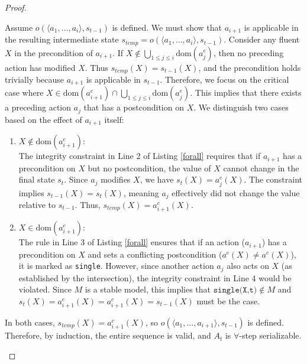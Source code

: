 \documentclass[
     11pt,                    %
     a4paper,             %
     BCOR=10mm,     %
     DIV=14,                 %
     listof=totoc,                    %
     bibliography=totoc,       %
     index=totoc,              %
     parskip            %
     twoside,
     headsepline
     ]{scrreprt}
\theoremstyle{definition}
\theoremstyle{definition}
\theoremstyle{remark}
\theoremstyle{bfnote}
\newcommand{\dom}{\mathrm{dom}}
\begin{document}
\begin{proof}
\begin{itemize}
      Assume $o(\langle a_1, \dots, a_i \rangle, s_{t-1})$ is defined. We must show that $a_{i+1}$ is applicable in the resulting intermediate state $s_{temp} = o(\langle a_1, \dots, a_i \rangle, s_{t-1})$.
      Consider any fluent $X$ in the precondition of $a_{i+1}$. 
      If $X \notin \bigcup_{1 \le j \le i} \dom(a_j^e)$, then no preceding action has modified $X$. Thus $s_{temp}(X) = s_{t-1}(X)$, and the precondition holds trivially because $a_{i+1}$ is applicable in $s_{t-1}$.
      Therefore, we focus on the critical case where $X \in \dom(a_{i+1}^c) \cap \bigcup_{1 \le j \le i} \dom(a_j^e)$.
      This implies that there exists a preceding action $a_j$ that has a postcondition on $X$. We distinguish two cases based on the effect of $a_{i+1}$ itself:
      \begin{enumerate}
        \item $X \notin \dom(a_{i+1}^e)$: \\
        The integrity constraint in Line 2 of Listing \ref{forall} requires that if $a_{i+1}$ has a precondition on $X$ but no postcondition, the value of $X$ cannot change in the final state $s_t$. Since $a_j$ modifies $X$, we have $s_t(X) = a_j^e(X)$. The constraint implies $s_{t-1}(X) = s_t(X)$, meaning $a_j$ effectively did not change the value relative to $s_{t-1}$. Thus, \mbox{$s_{temp}(X) = a_{i+1}^c(X)$}.
        \item $X \in \dom(a_{i+1}^e)$: \\
        The rule in Line 3 of Listing \ref{forall} ensures that if an action ($a_{i+1}$) has a precondition on $X$ and sets a conflicting postcondition ($a^c(X) \neq a^e(X)$), it is marked as \texttt{single}. However, since another action $a_j$ also acts on $X$ (as established by the intersection), the integrity constraint in Line 4 would be violated.
        Since $M$ is a stable model, this implies that $\texttt{single(X,t)} \notin M$ and \mbox{$s_t(X) = a_{i+1}^e(X) = a_{i+1}^c(X)=s_{t-1}(X)$} must be the case.
      \end{enumerate} 
      In both cases, $s_{temp}(X) = a_{i+1}^c(X)$, so $o(\langle a_1, \dots, a_{i+1} \rangle, s_{t-1})$ is defined.
      Therefore, by induction, the entire sequence is valid, and $A_t$ is $\forall$-step serializable. \vspace{0.5em}


\end{itemize}
\end{proof}
\end{document}
